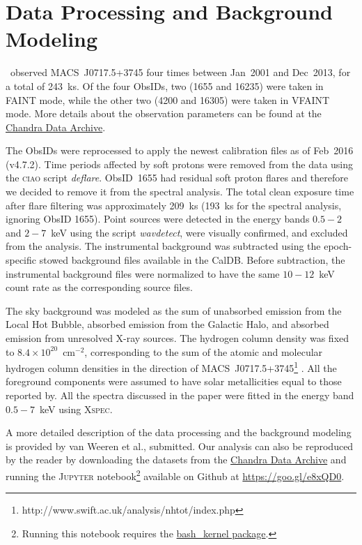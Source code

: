 \section{Data Processing and Background Modeling}
\label{sec:DataAnalysis}

\chandra\ observed MACS~J0717.5+3745 four times between Jan~2001 and Dec~2013, for a total of 243~ks. Of the four ObsIDs, two (1655 and 16235) were taken in FAINT mode, while the other two (4200 and 16305) were taken in VFAINT mode. More details about the observation parameters can be found at the \href{http://cda.harvard.edu/chaser/}{Chandra Data Archive}.

The ObsIDs were reprocessed to apply the newest calibration files as of Feb~2016 (v4.7.2). Time periods affected by soft protons were removed from the data using the \textsc{ciao} script \emph{deflare}. ObsID~1655 had residual soft proton flares and therefore we decided to remove it from the spectral analysis. The total clean exposure time after flare filtering was approximately 209~ks (193~ks for the spectral analysis, ignoring ObsID 1655). Point sources were detected in the energy bands $0.5-2$ and $2-7$~keV using the script \emph{wavdetect}, were visually confirmed, and excluded from the analysis. The instrumental background was subtracted using the epoch-specific stowed background files available in the CalDB. Before subtraction, the instrumental background files were normalized to have the same $10-12$~keV count rate as the corresponding source files. 

The sky background was modeled as the sum of unabsorbed emission from the Local Hot Bubble, absorbed emission from the Galactic Halo, and absorbed emission from unresolved X-ray sources. The hydrogen column density was fixed to $8.4\times 10^{20}$~cm$^{-2}$, corresponding to the sum of the atomic and molecular hydrogen column densities in the direction of MACS~J0717.5+3745\footnote{http://www.swift.ac.uk/analysis/nhtot/index.php} \citep{Kalberla2005, Willingale2013}. All the foreground components were assumed to have solar metallicities equal to those reported by\citet{Feldman1992}. All the spectra discussed in the paper were fitted in the energy band $0.5-7$~keV using \textsc{Xspec}.

A more detailed description of the data processing and the background modeling is provided by van Weeren et al., submitted. Our analysis can also be reproduced by the reader by downloading the datasets from the \href{http://cda.harvard.edu/chaser/}{Chandra Data Archive} and running the \textsc{Jupyter} notebook\footnote{Running this notebook requires the \href{https://github.com/takluyver/bash\_kernel}{bash\_kernel package}.} available on Github at \url{https://goo.gl/e8xQD0}. 
